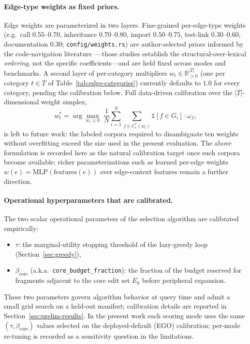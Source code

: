 \documentclass[11pt, a4paper]{article}
\providecommand{\mathbbm}[1]{\mathds{#1}}
\begin{document}
\paragraph{Edge-type weights as fixed priors.} Edge weights are parameterized in two layers. Fine-grained per-edge-type weights (e.g.\ call $0.55$--$0.70$, inheritance $0.70$--$0.80$, import $0.50$--$0.75$, test-link $0.30$--$0.60$, documentation $0.30$; \texttt{config/weights.rs}) are author-selected priors informed by the code-navigation literature~\cite{ko2006exploratory, robillard2004effective}---those studies establish the structural-over-lexical \emph{ordering}, not the specific coefficients---and are held fixed across modes and benchmarks. A second layer of per-category multipliers $w_t \in \mathbb{R}_{\geq 0}^{|T|}$ (one per category $t \in T$ of Table~\ref{tab:edge-categories}) currently defaults to $1.0$ for every category, pending the calibration below. Full data-driven calibration over the $|T|$-dimensional weight simplex,
\begin{equation}
w_t^* = \arg\max_{w_t \geq 0} \; \frac{1}{N} \sum_{i=1}^N \sum_{f \in C_i^*(w_t)} \mathbbm{1}[f \in G_i] \cdot \omega_f,
\end{equation}
is left to future work: the labeled corpora required to disambiguate ten weights without overfitting exceed the size used in the present evaluation. The above formulation is recorded here as the natural calibration target once such corpora become available; richer parameterizations such as learned per-edge weights $w(e) = \mathrm{MLP}(\mathrm{features}(e))$ over edge-context features remain a further direction.

\paragraph{Operational hyperparameters that are calibrated.} The two scalar operational parameters of the selection algorithm are calibrated empirically:
\begin{itemize}
    \item $\tau$: the marginal-utility stopping threshold of the lazy-greedy loop (Section~\ref{sec:greedy}),
    \item $\beta_{\mathrm{core}}$ (a.k.a.\ \texttt{core\_budget\_fraction}): the fraction of the budget reserved for fragments adjacent to the core edit set $E_0$ before peripheral expansion.
\end{itemize}
These two parameters govern algorithm behavior at query time and admit a small grid search on a held-out manifest; calibration details are reported in Section~\ref{sec:prelim-results}. In the present work each scoring mode uses the same $(\tau, \beta_{\mathrm{core}})$ values selected on the deployed-default (EGO) calibration; per-mode re-tuning is recorded as a sensitivity question in the limitations.
\end{document}
